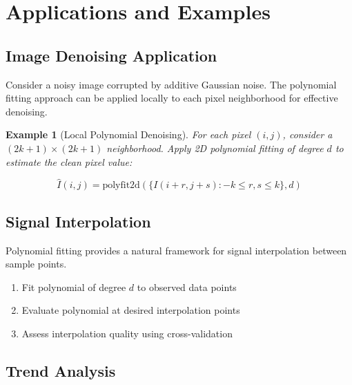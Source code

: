 \documentclass[12pt]{article}
\newtheorem{example}[theorem]{Example}
\begin{document}
\newpage

\section{Applications and Examples}

\subsection{Image Denoising Application}

Consider a noisy image corrupted by additive Gaussian noise. The polynomial fitting approach can be applied locally to each pixel neighborhood for effective denoising.

\begin{example}[Local Polynomial Denoising]
    For each pixel $(i, j)$, consider a $(2k+1) \times (2k+1)$ neighborhood. Apply 2D polynomial fitting of degree $d$ to estimate the clean pixel value:

    \begin{equation}
        \hat{I}(i, j) = \text{polyfit2d}(\{I(i+r, j+s) : -k \leq r, s \leq k\}, d)
    \end{equation}
\end{example}

\subsection{Signal Interpolation}

Polynomial fitting provides a natural framework for signal interpolation between sample points.

\begin{algorithm}
    \begin{enumerate}
        \item Fit polynomial of degree $d$ to observed data points
        \item Evaluate polynomial at desired interpolation points
        \item Assess interpolation quality using cross-validation
    \end{enumerate}
\end{algorithm}

\subsection{Trend Analysis}
\end{document}
